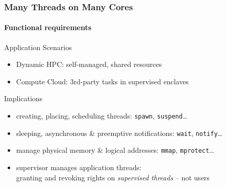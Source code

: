 \documentclass[9pt]{beamer}
\begin{document}
\begin{frame}
  \frametitle{Many Threads on Many Cores}
  \framesubtitle{Functional requirements}

\begin{block}{Application Scenarios}
\begin{itemize}
\item \alert{Dynamic HPC}: self-managed, shared resources
\item \alert{Compute Cloud}: 3rd-party tasks in supervised enclaves
\end{itemize}
\end{block}

\begin{block}{Implications}
\begin{itemize}
\item creating, placing, scheduling threads: \texttt{spawn}, \texttt{suspend}\ldots
\item sleeping, asynchronous \& preemptive notifications: \texttt{wait}, \texttt{notify}\ldots
\item manage physical memory \& logical addresses: \texttt{mmap}, \texttt{mprotect}\ldots
\item supervisor manages application threads:\\
  granting and revoking rights on \emph{supervised threads} -- not users
\end{itemize}
\end{block}
\end{frame}
\end{document}
